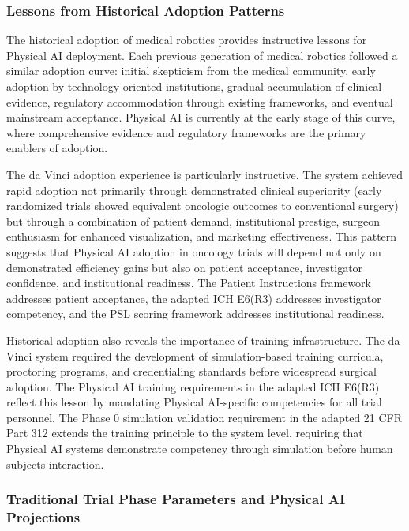 \subsubsection{Lessons from Historical Adoption Patterns}

The historical adoption of medical robotics provides instructive lessons for
Physical AI deployment. Each previous generation of medical robotics
followed a similar adoption curve: initial skepticism from the medical
community, early adoption by technology-oriented institutions, gradual
accumulation of clinical evidence, regulatory accommodation through existing
frameworks, and eventual mainstream acceptance. Physical AI is currently at
the early stage of this curve, where comprehensive evidence and regulatory
frameworks are the primary enablers of adoption.

The da Vinci adoption experience is particularly instructive. The system
achieved rapid adoption not primarily through demonstrated clinical
superiority (early randomized trials showed equivalent oncologic outcomes
to conventional surgery) but through a combination of patient demand,
institutional prestige, surgeon enthusiasm for enhanced visualization, and
marketing effectiveness. This pattern suggests that Physical AI adoption in
oncology trials will depend not only on demonstrated efficiency gains but
also on patient acceptance, investigator confidence, and institutional
readiness. The Patient Instructions framework
\cite{patient-instructions-paper} addresses patient acceptance, the adapted
ICH E6(R3) \cite{ich-adapt} addresses investigator competency, and the PSL
scoring framework \cite{usl-standard} addresses institutional readiness.

Historical adoption also reveals the importance of training infrastructure.
The da Vinci system required the development of simulation-based training
curricula, proctoring programs, and credentialing standards before widespread
surgical adoption. The Physical AI training requirements in the adapted ICH
E6(R3) \cite{ich-adapt} reflect this lesson by mandating Physical
AI-specific competencies for all trial personnel. The Phase 0 simulation
validation requirement in the adapted 21 CFR Part 312 \cite{cfr312-adapt}
extends the training principle to the system level, requiring that Physical
AI systems demonstrate competency through simulation before human subjects
interaction.

\subsubsection{Traditional Trial Phase Parameters and Physical AI Projections}

